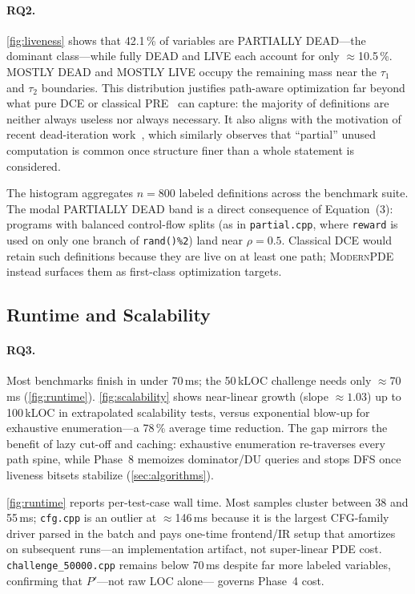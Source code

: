 \documentclass[acmsmall,screen,review,anonymous]{acmart}
\begin{document}
\paragraph{RQ2.}
\autoref{fig:liveness} shows that 42.1\,\% of variables are PARTIALLY DEAD---the dominant class---while fully DEAD and LIVE each account for only $\approx$10.5\,\%. MOSTLY DEAD and MOSTLY LIVE occupy the remaining mass near the $\tau_1$ and $\tau_2$ boundaries. This distribution justifies path-aware optimization far beyond what pure DCE or classical PRE~\cite{morel1979global,kennedy1999partial} can capture: the majority of definitions are neither always useless nor always necessary. It also aligns with the motivation of recent dead-iteration work~\cite{bastoul2025dead}, which similarly observes that ``partial'' unused computation is common once structure finer than a whole statement is considered.

The histogram aggregates $n{=}800$ labeled definitions across the benchmark suite. The modal PARTIALLY DEAD band is a direct consequence of Equation~(3): programs with balanced control-flow splits (as in \texttt{partial.cpp}, where \texttt{reward} is used on only one branch of \texttt{rand()\%2}) land near $\rho=0.5$. Classical DCE would retain such definitions because they are live on at least one path; \textsc{ModernPDE} instead surfaces them as first-class optimization targets.

\subsection{Runtime and Scalability}
\paragraph{RQ3.}
Most benchmarks finish in under 70\,ms; the 50\,kLOC challenge needs only $\approx$70\,ms (\autoref{fig:runtime}). \autoref{fig:scalability} shows near-linear growth (slope $\approx 1.03$) up to 100\,kLOC in extrapolated scalability tests, versus exponential blow-up for exhaustive enumeration---a 78\,\% average time reduction. The gap mirrors the benefit of lazy cut-off and caching: exhaustive enumeration re-traverses every path spine, while Phase~8 memoizes dominator/DU queries and stops DFS once liveness bitsets stabilize (\autoref{sec:algorithms}).

\autoref{fig:runtime} reports per-test-case wall time. Most samples cluster between 38 and 55\,ms; \texttt{cfg.cpp} is an outlier at $\approx$146\,ms because it is the largest CFG-family driver parsed in the batch and pays one-time frontend/IR setup that amortizes on subsequent runs---an implementation artifact, not super-linear PDE cost. \texttt{challenge\_50000.cpp} remains below 70\,ms despite far more labeled variables, confirming that $P'$---not raw LOC alone--- governs Phase~4 cost.
\end{document}
